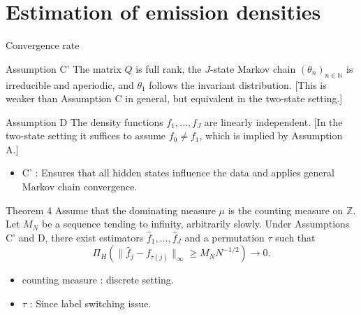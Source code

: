 \documentclass[10pt, aspectratio=169]{beamer}
\begin{document}
\section[Estimation of Emission Densities]{Estimation of emission densities}
\begin{frame}{Convergence rate}
   \begin{assumpbox}{Assumption C'}
        The matrix \( Q \) is full rank, the \( J \)-state Markov chain \( (\theta_n)_{n \in \mathbb{N}} \) is irreducible and aperiodic, and \( \theta_1 \) follows the invariant distribution. [This is weaker than Assumption C in general, but equivalent in the two-state setting.]
    \end{assumpbox}

    \begin{assumpbox}{Assumption D}
        The density functions \( f_1, \ldots, f_J \) are linearly independent. [In the two-state setting it suffices to assume \( f_0 \neq f_1 \), which is implied by Assumption A.]
    \end{assumpbox}
    \begin{itemize}[label=\scalebox{0.5}{$\blacksquare$}]
    \item C' : Ensures that all hidden states influence the data and applies general Markov chain convergence.
    \end{itemize}
\end{frame}
\begin{frame}
   \begin{mytheorembox}{Theorem 4}
        Assume that the dominating measure \( \mu \) is the counting measure on \( \mathbb{Z} \). Let \( M_N \) be a sequence tending to infinity, arbitrarily slowly. Under Assumptions C' and D, there exist estimators \( \hat{f}_1, \ldots, \hat{f}_J \) and a permutation \( \tau \) such that
        \[
        \Pi_H \left( \| \hat{f}_j - f_{\tau(j)} \|_\infty \geq M_N N^{-1/2} \right) \to 0.
        \]
    \end{mytheorembox}
    \begin{itemize}[label=\scalebox{0.5}{$\blacksquare$}]
    \item counting measure : discrete setting.
    \item $\tau$ : Since label switching issue.
    \end{itemize}
\end{frame}
\end{document}
